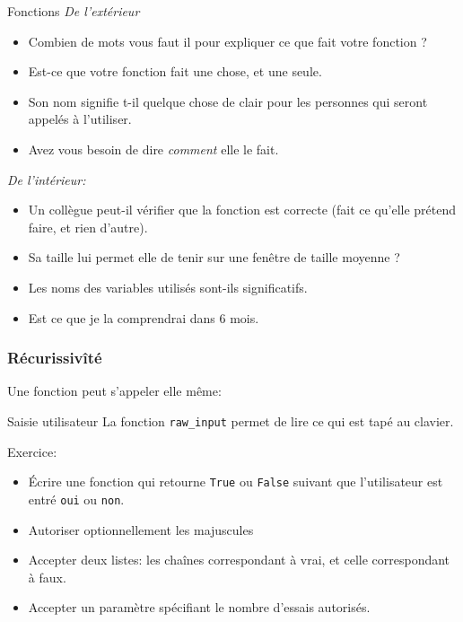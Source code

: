 \documentclass{beamer}
\begin{document}
\begin{frame}{Fonctions}
  {\em De l'extérieur}
  \begin{itemize}
  \item Combien de mots vous faut il pour expliquer ce que fait votre fonction ?
  \item Est-ce que votre fonction fait une chose, et une seule.
  \item Son nom signifie t-il quelque chose de clair pour les personnes qui seront appelés à l'utiliser.
  \item Avez vous besoin de dire {\em comment} elle le fait.
  \end{itemize}    
  {\em De l'intérieur:}
  \begin{itemize}
  \item Un collègue peut-il vérifier que la fonction est correcte (fait ce qu'elle prétend faire, et rien d'autre).
  \item Sa taille lui permet elle de tenir sur une fenêtre de taille moyenne ?
  \item Les noms des variables utilisés sont-ils significatifs.
  \item Est ce que je la comprendrai dans 6 mois.
  \end{itemize}
\end{frame}

\begin{frame}[fragile]\frametitle{Récurissivîté}
  Une fonction peut s'appeler elle même:
  
  \fbox{}

\end{frame}

\begin{frame}{Saisie utilisateur}
  La fonction {\tt raw\_input} permet de lire ce qui est tapé au clavier.

  Exercice:
  \begin{itemize}
  \item Écrire une fonction qui retourne {\tt True} ou {\tt False} suivant que l'utilisateur est entré {\tt oui} ou {\tt non}.
  \item Autoriser optionnellement les majuscules
  \item Accepter deux listes: les chaînes correspondant à vrai, et celle correspondant à faux.
  \item Accepter un paramètre spécifiant le nombre d'essais autorisés.
  \end{itemize}
\end{frame}
\end{document}
